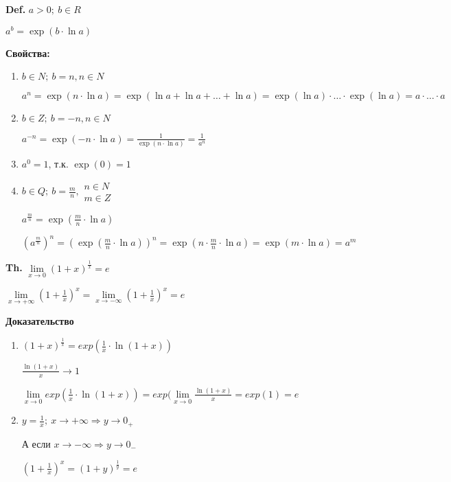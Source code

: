\documentclass[14pt, letter paper]{article}
\begin{document}
\vspace{5mm}

\textbf{Def.} $a > 0;\ b \in R$

$a^b = \exp(b \cdot \ln{a})$

\textbf{Свойства:}

\begin{enumerate}
    \item $b \in N;\ b = n, n \in N$

    $a^n = \exp(n \cdot \ln{a}) = \exp(\ln{a} + \ln{a} + \ldots + \ln{a}) = \exp(\ln{a}) \cdot \ldots \cdot \exp(\ln{a}) = a \cdot \ldots \cdot a$

    \item $b \in Z;\ b = -n, n \in N$

    $a^{-n} = \exp(-n \cdot \ln{a}) = \frac{1}{\exp(n \cdot \ln{a})} = \frac{1}{a^n}$

    \item $a^0 = 1$, т.к. $\exp(0) = 1$

    \item $b \in Q;\ b = \frac{m}{n}, \begin{gathered}
        n \in N \\
        m \in Z
    \end{gathered}$

    $a^\frac{m}{n} = \exp(\frac{m}{n} \cdot \ln{a})$

    $(a^\frac{m}{n})^n = (\exp(\frac{m}{n} \cdot \ln{a}))^n = \exp(n \cdot \frac{m}{n} \cdot \ln{a}) = \exp(m \cdot \ln{a}) = a^m$
\end{enumerate}

\vspace{5mm}

\textbf{Th.} $\lim\limits_{x \rightarrow 0}{(1 + x)^\frac{1}{x}} = e$

$\lim\limits_{x \rightarrow + \infty}{(1 + \frac{1}{x})^x} = \lim\limits_{x \rightarrow - \infty}{(1 + \frac{1}{x})^x} = e$

\begin{center}
    \textbf{Доказательство}
\end{center}

\begin{enumerate}
    \item $(1 + x)^\frac{1}{x} = exp(\frac{1}{x} \cdot \ln{(1 + x)})$

$\frac{\ln{(1+x)}}{x} \rightarrow 1$

$\lim\limits_{x \rightarrow 0}{exp(\frac{1}{x} \cdot \ln{(1 + x)})} = exp(\lim\limits_{x \rightarrow 0}{\frac{\ln{(1 + x)}}{x}} = exp(1) = e$

    \item $y = \frac{1}{x};\ x \rightarrow + \infty \Rightarrow y \rightarrow 0_+$

    А если $x \rightarrow - \infty \Rightarrow y \rightarrow 0_-$
    
    $(1 + \frac{1}{x})^x = (1 + y)^\frac{1}{y} = e$
\end{enumerate}
\end{document}
